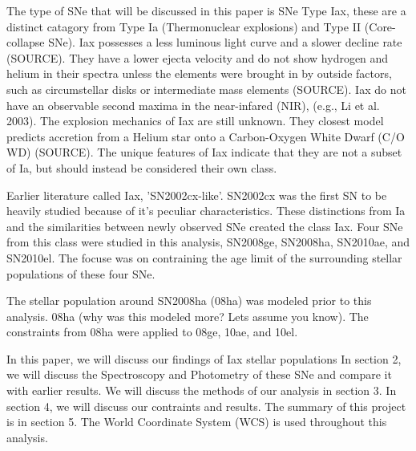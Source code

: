 \documentclass[preprint2]{aastex}
\begin{document}
The type of SNe that will be discussed in this paper is SNe Type Iax, 
these are a distinct catagory from Type Ia (Thermonuclear explosions)
and Type II (Core-collapse SNe). 
Iax possesses a less luminous light curve and a slower decline rate (SOURCE).
They have a lower ejecta velocity and do not show hydrogen and helium in their
 spectra unless the elements were brought in by outside factors,
such as circumstellar disks or intermediate mass elements (SOURCE). 
Iax do not have an observable second maxima in the near-infared (NIR), 
(e.g., Li et al. 2003).
The explosion mechanics of Iax are still unknown.
They closest model predicts accretion from a Helium star onto a Carbon-Oxygen
 White Dwarf (C/O WD) (SOURCE). 
The unique features of Iax indicate that they are not a subset of Ia, 
but should instead be considered their own class. 

Earlier literature called Iax, 'SN2002cx-like'. SN2002cx was the first SN to be heavily 
studied because of it's peculiar characteristics. 
These distinctions from Ia and the similarities between newly observed SNe 
created the class Iax. 
Four SNe from this class were studied in this analysis, SN2008ge, SN2008ha, 
SN2010ae, and SN2010el. 
The focuse was on contraining the age limit of the
surrounding stellar populations of these four SNe.

The stellar population around SN2008ha (08ha) was modeled prior to this analysis. 
08ha (why was this modeled more? Lets assume you know).
The constraints from 08ha were applied to 08ge, 10ae, and 10el. 

In this paper, we will discuss our findings of Iax stellar populations
 In section 2, we will discuss the Spectroscopy and Photometry of these SNe and 
compare it with earlier results. 
We will discuss the methods of our analysis in section 3. 
In section 4, we will discuss our contraints and results.
The summary of this project is in section 5. 
The World Coordinate System (WCS) is used throughout this analysis. 
\end{document}

